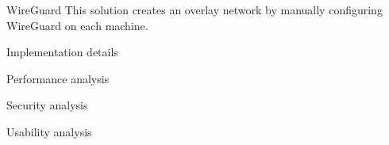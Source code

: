 \begin{frame}{WireGuard}
\protect\hypertarget{wireguard}{}
This solution creates an overlay network by manually configuring
WireGuard on each machine.

\begin{block}{Implementation details}
\protect\hypertarget{implementation-details}{}
\end{block}

\begin{block}{Performance analysis}
\protect\hypertarget{performance-analysis}{}
\end{block}

\begin{block}{Security analysis}
\protect\hypertarget{security-analysis}{}
\end{block}

\begin{block}{Usability analysis}
\protect\hypertarget{usability-analysis}{}
\end{block}
\end{frame}

